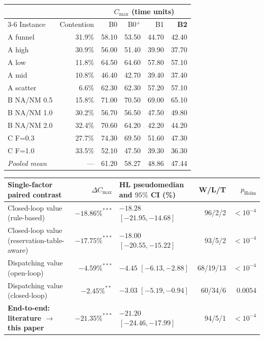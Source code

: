 \begin{tabular}{@{}lrrrrr@{}}
\toprule
& & \multicolumn{4}{c}{$C_{\max}$ (time units)} \\
\cmidrule(lr){3-6}
Instance & Contention & B0 & B0$^{+}$ & B1 & \textbf{B2} \\
\midrule
A funnel & 31.9\% & 58.10 & 53.50 & 44.70 & 42.40 \\
A high & 30.9\% & 56.00 & 51.40 & 39.90 & 37.70 \\
A low & 11.8\% & 64.50 & 64.60 & 57.80 & 57.10 \\
A mid & 10.8\% & 46.40 & 42.70 & 39.40 & 37.40 \\
A scatter & 6.6\% & 62.30 & 62.30 & 57.20 & 57.10 \\
\midrule
B NA/NM 0.5 & 15.8\% & 71.00 & 70.50 & 69.00 & 65.10 \\
B NA/NM 1.0 & 30.2\% & 56.70 & 56.50 & 47.50 & 49.80 \\
B NA/NM 2.0 & 32.4\% & 70.60 & 64.20 & 42.20 & 44.20 \\
\midrule
C F=0.3 & 27.7\% & 74.30 & 69.50 & 51.60 & 47.30 \\
C F=1.0 & 33.5\% & 52.10 & 47.50 & 39.30 & 36.30 \\
\midrule
\emph{Pooled mean} & --- & 61.20 & 58.27 & 48.86 & 47.44 \\
\bottomrule
\end{tabular}

\vspace{0.6em}

\begin{tabular}{@{}lrlrr@{}}
\toprule
Single-factor paired contrast & $\Delta C_{\max}$ & HL pseudomedian and $95\%$ CI (\%) & W/L/T & $p_{\mathrm{Holm}}$ \\
\midrule
Closed-loop value (rule-based) & $-18.86\%^{***}$ & $-18.28$ $[-21.95,-14.68]$ & 96/2/2 & $<10^{-4}$ \\
Closed-loop value (reservation-table-aware) & $-17.75\%^{***}$ & $-18.00$ $[-20.55,-15.22]$ & 93/5/2 & $<10^{-4}$ \\
Dispatching value (open-loop) & $-4.59\%^{***}$ & $-4.45$ $[-6.13,-2.88]$ & 68/19/13 & $<10^{-4}$ \\
Dispatching value (closed-loop) & $-2.45\%^{**}$ & $-3.03$ $[-5.19,-0.94]$ & 60/34/6 & $0.0054$ \\
\midrule
\textbf{End-to-end: literature $\rightarrow$ this paper} & $-21.35\%^{***}$ & $-21.20$ $[-24.46,-17.99]$ & 94/5/1 & $<10^{-4}$ \\
\bottomrule
\end{tabular}

